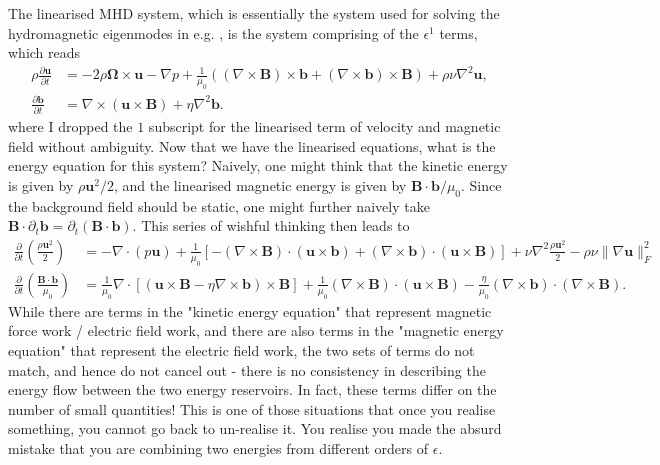 %
The linearised MHD system, which is essentially the system used for solving the hydromagnetic eigenmodes in e.g. \citet{luo_waves_2022,luo_waves2_2022,gerick_interannual_2024}, is the system comprising of the $\epsilon^1$ terms, which reads
%
\begin{equation}
\begin{aligned}
    \rho \frac{\partial \mathbf{u}}{\partial t} &= - 2 \rho \boldsymbol{\Omega}\times \mathbf{u} - \nabla p + \frac{1}{\mu_0} \left((\nabla\times \mathbf{B})\times \mathbf{b} + (\nabla\times \mathbf{b})\times \mathbf{B}\right) + \rho \nu \nabla^2 \mathbf{u}, \\ 
    \frac{\partial \mathbf{b}}{\partial t} &= \nabla\times (\mathbf{u}\times \mathbf{B}) + \eta \nabla^2 \mathbf{b}.
\end{aligned}
\end{equation}
%
where I dropped the $1$ subscript for the linearised term of velocity and magnetic field without ambiguity.
Now that we have the linearised equations, what is the energy equation for this system? Naively, one might think that the kinetic energy is given by $\rho \mathbf{u}^2/2$, and the linearised magnetic energy is given by $\mathbf{B}\cdot \mathbf{b}/\mu_0$. Since the background field should be static, one might further naively take $\mathbf{B}\cdot \partial_t \mathbf{b} = \partial_t (\mathbf{B}\cdot \mathbf{b})$.
This series of wishful thinking then leads to
%
\[
\begin{aligned}
    \frac{\partial}{\partial t} \left(\frac{\rho \mathbf{u}^2}{2}\right) &= - \nabla \cdot (p\mathbf{u}) + \frac{1}{\mu_0}\left[-(\nabla\times \mathbf{B})\cdot (\mathbf{u}\times \mathbf{b}) + (\nabla\times \mathbf{b})\cdot (\mathbf{u}\times \mathbf{B})\right] + \nu \nabla^2 \frac{\rho\mathbf{u}^2}{2} - \rho \nu \|\nabla\mathbf{u}\|_F^2 \\ 
    \frac{\partial}{\partial t} \left(\frac{\mathbf{B}\cdot \mathbf{b}}{\mu_0}\right) &= \frac{1}{\mu_0}\nabla\cdot \left[(\mathbf{u}\times \mathbf{B} - \eta \nabla\times \mathbf{b})\times \mathbf{B}\right] + \frac{1}{\mu_0}(\nabla\times \mathbf{B})\cdot (\mathbf{u}\times \mathbf{B}) - \frac{\eta}{\mu_0} (\nabla\times \mathbf{b})\cdot (\nabla\times \mathbf{B}).
\end{aligned}
\]
%
While there are terms in the "kinetic energy equation" that represent magnetic force work / electric field work, and there are also terms in the "magnetic energy equation" that represent the electric field work, the two sets of terms do not match, and hence do not cancel out - there is no consistency in describing the energy flow between the two energy reservoirs. In fact, these terms differ on the number of small quantities! This is one of those situations that once you realise something, you cannot go back to un-realise it. You realise you made the absurd mistake that you are combining two energies from different orders of $\epsilon$.

